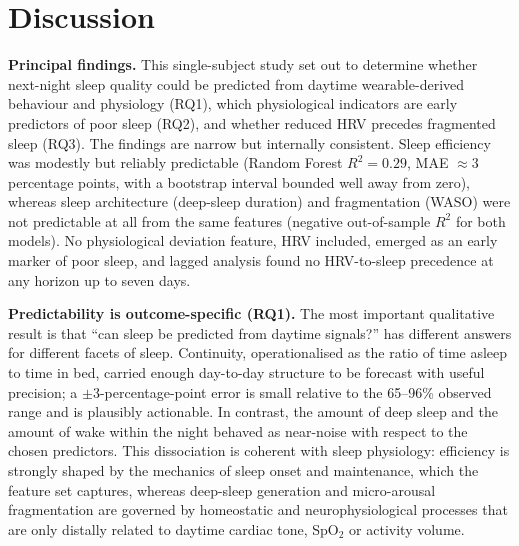 \documentclass[fleqn,10pt]{wlscirep}
\begin{document}
\section*{Discussion}

\noindent\textbf{Principal findings.} This single-subject study set out to determine whether next-night sleep quality could be predicted from daytime wearable-derived behaviour and physiology (RQ1), which physiological indicators are early predictors of poor sleep (RQ2), and whether reduced HRV precedes fragmented sleep (RQ3). The findings are narrow but internally consistent. Sleep efficiency was modestly but reliably predictable (Random Forest $R^2 = 0.29$, MAE $\approx 3$ percentage points, with a bootstrap interval bounded well away from zero), whereas sleep architecture (deep-sleep duration) and fragmentation (WASO) were not predictable at all from the same features (negative out-of-sample $R^2$ for both models). No physiological deviation feature, HRV included, emerged as an early marker of poor sleep, and lagged analysis found no HRV-to-sleep precedence at any horizon up to seven days.

\noindent\textbf{Predictability is outcome-specific (RQ1).} The most important qualitative result is that ``can sleep be predicted from daytime signals?'' has different answers for different facets of sleep. Continuity, operationalised as the ratio of time asleep to time in bed, carried enough day-to-day structure to be forecast with useful precision; a $\pm$3-percentage-point error is small relative to the 65--96\% observed range and is plausibly actionable. In contrast, the amount of deep sleep and the amount of wake within the night behaved as near-noise with respect to the chosen predictors. This dissociation is coherent with sleep physiology: efficiency is strongly shaped by the mechanics of sleep onset and maintenance, which the feature set captures, whereas deep-sleep generation and micro-arousal fragmentation are governed by homeostatic and neurophysiological processes that are only distally related to daytime cardiac tone, SpO$_2$ or activity volume.
\end{document}
